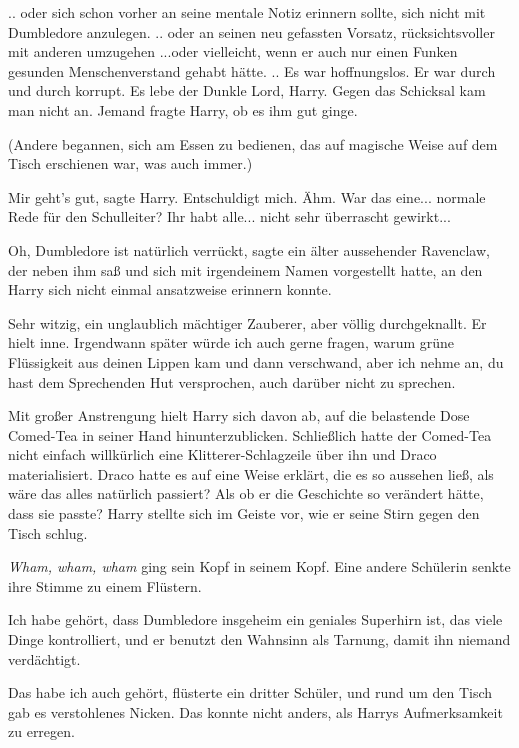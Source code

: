 .. oder sich schon vorher an seine mentale Notiz erinnern sollte, sich nicht mit
Dumbledore anzulegen. .. oder an seinen neu gefassten Vorsatz, rücksichtsvoller
mit anderen umzugehen ...oder vielleicht, wenn er auch nur einen Funken gesunden
Menschenverstand gehabt hätte. .. Es war hoffnungslos. Er war durch und durch
korrupt. Es lebe der Dunkle Lord, Harry. Gegen das Schicksal kam man nicht an.
Jemand fragte Harry, ob es ihm gut ginge.

(Andere begannen, sich am Essen zu bedienen, das auf magische Weise auf dem
Tisch erschienen war, was auch immer.)

\glqq Mir geht's gut\grqq{}, sagte Harry. \glqq Entschuldigt mich. Ähm. War das
eine... normale Rede für den Schulleiter? Ihr habt alle... nicht sehr überrascht
gewirkt...\grqq{}

\glqq Oh, Dumbledore ist natürlich verrückt\grqq{}, sagte ein älter aussehender
Ravenclaw, der neben ihm saß und sich mit irgendeinem Namen vorgestellt hatte,
an den Harry sich nicht einmal ansatzweise erinnern konnte.

\glqq Sehr witzig, ein unglaublich mächtiger Zauberer, aber völlig
durchgeknallt.\grqq{} Er hielt inne. \glqq Irgendwann später würde ich auch
gerne fragen, warum grüne Flüssigkeit aus deinen Lippen kam und dann verschwand,
aber ich nehme an, du hast dem Sprechenden Hut versprochen, auch darüber nicht
zu sprechen.\grqq{}

Mit großer Anstrengung hielt Harry sich davon ab, auf die belastende Dose
Comed-Tea in seiner Hand hinunterzublicken. Schließlich hatte der Comed-Tea
nicht einfach willkürlich eine Klitterer-Schlagzeile über ihn und Draco
materialisiert. Draco hatte es auf eine Weise erklärt, die es so aussehen ließ,
als wäre das alles natürlich passiert? Als ob er die Geschichte so verändert
hätte, dass sie passte? Harry stellte sich im Geiste vor, wie er seine Stirn
gegen den Tisch schlug.

\emph{Wham, wham, wham} ging sein Kopf in seinem Kopf. Eine andere Schülerin
senkte ihre Stimme zu einem Flüstern.

\glqq Ich habe gehört, dass Dumbledore insgeheim ein geniales Superhirn ist, das
viele Dinge kontrolliert, und er benutzt den Wahnsinn als Tarnung, damit ihn
niemand verdächtigt.\grqq{}

\glqq Das habe ich auch gehört\grqq{}, flüsterte ein dritter Schüler, und rund
um den Tisch gab es verstohlenes Nicken. Das konnte nicht anders, als Harrys
Aufmerksamkeit zu erregen.

